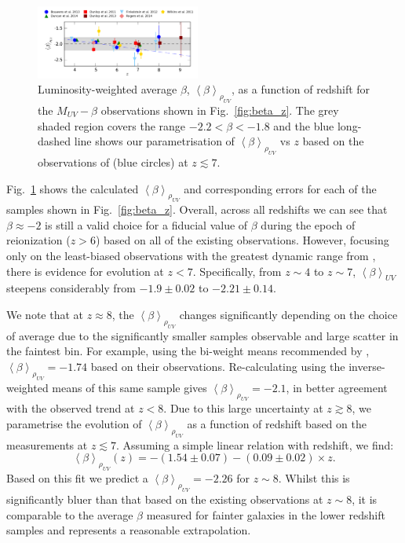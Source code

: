 \begin{figure}
  \includegraphics[width=0.48\textwidth]{plots/Fig3.pdf}
  \caption{Luminosity-weighted average $\beta$, $\left \langle \beta  \right \rangle_{\rho_{UV}}$, as a function of redshift for the $M_{UV}-\beta$ observations shown in Fig.~\ref{fig:beta_z}. The grey shaded region covers the range $-2.2 < \beta < -1.8$ and the blue long-dashed line shows our parametrisation of $\left \langle \beta \right \rangle_{\rho_{UV}}$ vs $z$ based on the observations of \citet{Bouwens:2013vf} (blue circles) at $z \lesssim 7$.}
  \label{fig:beta_weightedavg}
\end{figure}

Fig.~\ref{fig:beta_weightedavg} shows the calculated $\left \langle \beta  \right \rangle_{\rho_{UV}}$ and corresponding errors for each of the samples shown in Fig.~\ref{fig:beta_z}. Overall, across all redshifts we can see that $\beta \approx -2$ is still a valid choice for a fiducial value of $\beta$ during the epoch of reionization ($z > 6$) based on all of the existing observations. However, focusing only on the least-biased observations with the greatest dynamic range from \citet{Bouwens:2013vf}, there is evidence for evolution at $z < 7$. Specifically, from $z\sim4$ to $z\sim7$, $\left \langle \beta  \right \rangle_{UV}$ steepens considerably from  $-1.9\pm0.02$  to $-2.21\pm0.14$.

We note that at $z\approx 8$, the $\left \langle \beta \right \rangle_{\rho_{UV}}$ changes significantly depending on the choice of average due to the significantly smaller samples observable and large scatter in the faintest bin. For example, using the bi-weight means recommended by \citet{Bouwens:2013vf}, $\left \langle \beta \right \rangle_{\rho_{UV}} = -1.74$ based on their observations. Re-calculating using the inverse-weighted means of this same sample gives $\left \langle \beta  \right \rangle_{\rho_{UV}} = -2.1$, in better agreement with the observed trend at $z < 8$. Due to this large uncertainty at $z\gtrsim 8$, we parametrise the evolution of $\left \langle \beta \right \rangle_{\rho_{UV}}$ as a function of redshift based on the \citet{Bouwens:2013vf} measurements at $z\lesssim7$. Assuming a simple linear relation with redshift, we find:
\begin{equation}\label{eq:beta_muv_fit}
    \left \langle \beta \right \rangle_{\rho_{UV}}(z) = -(1.54 \pm 0.07) - (0.09 \pm 0.02)\times z.
\end{equation}
Based on this fit we predict a $\left \langle \beta \right \rangle_{\rho_{UV}} = -2.26$ for $z\sim8$. Whilst this is significantly bluer than that based on the existing observations at $z\sim8$, it is comparable to the average $\beta$ measured for fainter galaxies in the lower redshift samples and represents a reasonable extrapolation.

